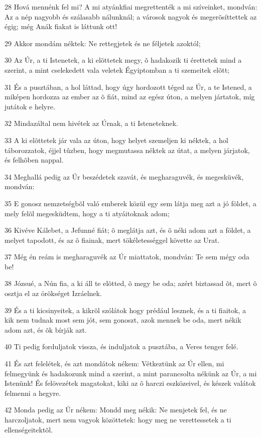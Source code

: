 \par 28 Hová mennénk fel mi? A mi atyánkfiai megrettenték a mi szíveinket, mondván: Az a nép nagyobb és szálasabb nálunknál; a városok nagyok és megerõsíttettek az égig; még Anák fiakat is láttunk ott!
\par 29 Akkor mondám néktek: Ne rettegjetek és ne féljetek azoktól;
\par 30 Az Úr, a ti Istenetek, a ki elõttetek megy, õ hadakozik ti érettetek mind a szerint, a mint cselekedett vala veletek Égyiptomban a ti szemeitek elõtt;
\par 31 És a pusztában, a hol láttad, hogy úgy hordozott téged az Úr, a te Istened, a miképen hordozza az ember az õ fiát, mind az egész úton, a melyen jártatok, míg jutátok e helyre.
\par 32 Mindazáltal nem hivétek az Úrnak, a ti Isteneteknek.
\par 33 A ki elõttetek jár vala az úton, hogy helyet szemeljen ki néktek, a hol táborozzatok, éjjel tûzben, hogy megmutassa néktek az útat, a melyen járjatok, és felhõben nappal.
\par 34 Meghallá pedig az Úr beszédetek szavát, és megharaguvék, és megesküvék, mondván:
\par 35 E gonosz nemzetségbõl való emberek közül egy sem látja meg azt a jó földet, a mely felõl megesküdtem, hogy a ti atyáitoknak adom;
\par 36 Kivéve Kálebet, a Jefunné fiát; õ meglátja azt, és õ néki adom azt a földet, a melyet tapodott, és az õ fiainak, mert tökéletességgel követte az Urat.
\par 37 Még én reám is megharaguvék az Úr miattatok, mondván: Te sem mégy oda be!
\par 38 Józsué, a Nún fia, a ki áll te elõtted, õ megy be oda; azért biztassad õt, mert õ  osztja el az örökséget Izráelnek.
\par 39 És a ti kicsinyeitek, a kikrõl szólátok hogy prédául lesznek, és a ti fiaitok, a kik nem tudnak most sem jót, sem gonoszt, azok mennek be oda, mert nékik adom azt, és õk bírják azt.
\par 40 Ti pedig forduljatok vissza, és induljatok a pusztába, a Veres tenger felé.
\par 41 És azt felelétek, és azt mondátok nékem: Vétkeztünk az Úr ellen, mi felmegyünk és hadakozunk mind a szerint, a mint parancsolta nékünk az Úr, a mi Istenünk! És felövezétek magatokat, kiki az õ harczi eszközeivel, és készek valátok felmenni a hegyre.
\par 42 Monda pedig az Úr nékem: Mondd meg nékik: Ne menjetek fel, és ne harczoljatok, mert nem vagyok közöttetek: hogy meg ne verettessetek a ti ellenségeitektõl.
